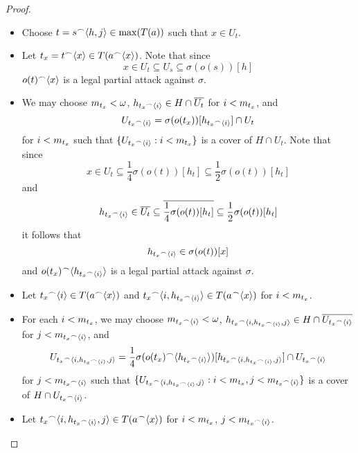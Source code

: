 \begin{proof}
\begin{itemize}
          \item Choose $t=s^\frown\langle h,j\rangle\in\max(T(a))$ such that $x\in U_{t}$.
          \item Let ${{t_x}}=t^\frown\langle x\rangle\in T(a^\frown\langle x\rangle)$. Note that since 
            \[
            x\in U_t \subseteq U_{s} \subseteq \sigma(o(s))[h]
            \]
          $o(t)^\frown\langle x\rangle$ is a legal partial attack against $\sigma$.
          \item We may choose $m_{{t_x}}<\omega$, $h_{{t_x}^\frown\langle i\rangle}\in H\cap\overline{U_t}$ for $i<m_{{t_x}}$, and 
            \[
              U_{{{t_x}}^\frown\langle i\rangle}
                =
              \sigma(o({t_x}))[h_{{{t_x}}^\frown\langle i\rangle}]
                \cap 
              U_{t}
            \]
            for $i<m_{{t_x}}$ such that $\{U_{{{t_x}}^\frown\langle i\rangle}:i<m_{{t_x}}\}$ is a cover of $H\cap U_{t}$. Note that since 
            \[
              x
                \in 
              U_t
                \subseteq
              \frac{1}{4}\sigma(o(t))[h_t]
                \subseteq
              \frac{1}{2}\sigma(o(t))[h_t]
            \]
            and
            \[
              h_{{{t_x}}^\frown\langle i\rangle}
                \in
              \overline{U_t}
                \subseteq
              \overline{\frac{1}{4}\sigma(o(t))[h_t]}
                \subseteq
              \frac{1}{2}\sigma(o(t))[h_t]
            \]
            it follows that
            \[
              h_{{{t_x}}^\frown\langle i\rangle}
                \in
              \sigma(o(t))[x]
            \]
            and $o(t_x)^\frown\langle h_{{{t_x}}^\frown\langle i\rangle}\rangle$ is a legal partial attack against $\sigma$.
          \item Let ${{t_x}}^\frown\langle i\rangle\in T(a^\frown\langle x\rangle)$ and ${{t_x}}^\frown\langle i,h_{{{t_x}}^\frown\langle i\rangle}\rangle\in T(a^\frown\langle x\rangle)$ for $i<m_{{t_x}}$.
          \item For each $i<m_{{t_x}}$, we may choose $m_{{{t_x}}^\frown\langle i\rangle}<\omega$, $h_{{{t_x}}^\frown\langle i,h_{{{t_x}}^\frown\langle i\rangle},j\rangle}\in H\cap \overline{U_{{{t_x}}^\frown\langle i\rangle}}$ for $j<m_{{{t_x}}^\frown\langle i\rangle}$, and 
            \[
              U_{{{t_x}}^\frown\langle i,h_{{{t_x}}^\frown\langle i\rangle},j\rangle}
                =
              \frac{1}{4}\sigma(o({t_x})^\frown\langle h_{{{t_x}}^\frown\langle i\rangle}\rangle)[h_{{{t_x}}^\frown\langle i,h_{{{t_x}}^\frown\langle i\rangle},j\rangle}]
                \cap
              U_{{{t_x}}^\frown\langle i\rangle}
            \]
            for $j<m_{{{t_x}}^\frown\langle i\rangle}$ such that $\{U_{{{t_x}}^\frown\langle i,h_{{{t_x}}^\frown\langle i\rangle},j\rangle}:i<m_{{t_x}},j<m_{{{t_x}}^\frown\langle i\rangle}\}$ is a cover of $H\cap U_{{{t_x}}^\frown\langle i\rangle}$.
          \item Let ${{t_x}}^\frown\langle i,h_{{{t_x}}^\frown\langle i\rangle},j\rangle\in T(a^\frown\langle x\rangle)$ for $i<m_{{t_x}}$, $j<m_{{{t_x}}^\frown\langle i\rangle}$.
        \end{itemize}


\end{proof}
